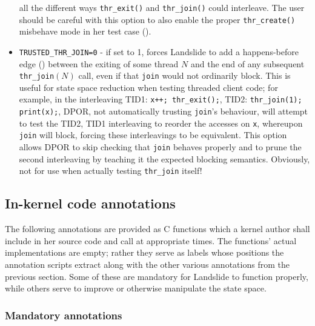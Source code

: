 \begin{itemize}
		all the different ways {\tt thr\_exit()} and {\tt thr\_join()} could interleave.
		The user should be careful with this option to also enable the proper {\tt thr\_create()} misbehave mode
		in her test case (\sect{\ref{sec:landslide-friendly-misbehave}}).
	\item {\tt TRUSTED\_THR\_JOIN=0} - if set to 1, forces Landslide to add a happens-before edge (\sect{\ref{sec:landslide-dpor-hb}}) between the exiting of some thread $N$ and the end of any subsequent {\tt thr\_join}$(N)$ call,
		even if that {\tt join} would not ordinarily block.
		This is useful for state space reduction when testing threaded client code;
		for example,
		in the interleaving
		TID1: {\tt x++; thr\_exit();},
		TID2: {\tt thr\_join(1); print(x);},
		DPOR, not automatically trusting {\tt join}'s behaviour,
		will attempt to test the TID2, TID1 interleaving to reorder the accesses on {\tt x},
		whereupon {\tt join} will block, forcing these interleavings to be equivalent.
		This option allows DPOR to skip checking that {\tt join} behaves properly
		and to prune the second interleaving
		by teaching it the expected blocking semantics. %
		Obviously, not for use when actually testing {\tt thr\_join} itself!
\end{itemize}


\subsection{In-kernel code annotations}
\label{sec:tell-landslide}

The following annotations are provided as C functions
which a kernel author shall include in her source code and call at appropriate times.
The functions' actual implementations are empty;
rather they serve as labels whose positions the annotation scripts extract
along with the other various annotations from the previous section.
Some of these are mandatory for Landslide to function properly,
while others serve to improve or otherwise manipulate the state space.

\subsubsection{Mandatory annotations}

